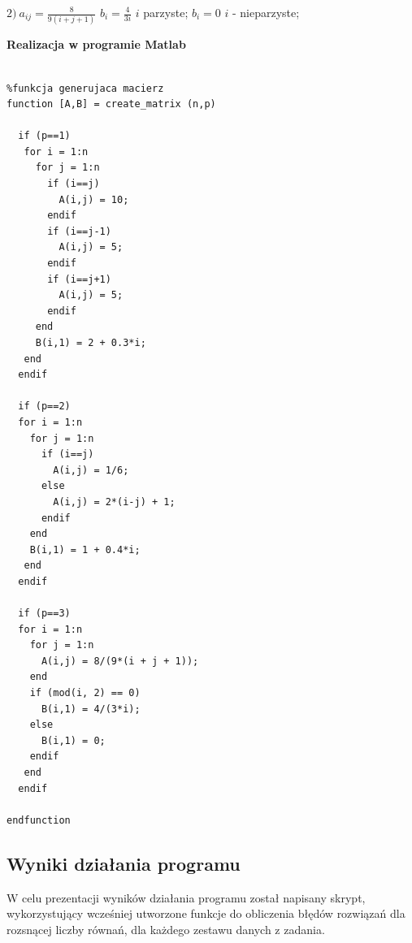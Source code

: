 \documentclass[a4paper, 11pt]{article}
\begin{document}
\hspace{2,4cm} $2) \ a_{ij} = \frac{8}{9(i+j+1)}$  \hspace{1cm} $b_{i} =\frac{4}{3i}$ $i$ parzyste; $b_{i} = 0$ $i$ - nieparzyste; \\

\vspace{1cm}

\textbf{Realizacja w programie Matlab}\\
\\
\begin{lstlisting}
%funkcja generujaca macierz 
function [A,B] = create_matrix (n,p)

  if (p==1)
   for i = 1:n
     for j = 1:n
       if (i==j)
         A(i,j) = 10;
       endif
       if (i==j-1)
         A(i,j) = 5;
       endif
       if (i==j+1)
         A(i,j) = 5;
       endif
     end
     B(i,1) = 2 + 0.3*i;
   end
  endif

  if (p==2) 
  for i = 1:n
    for j = 1:n
      if (i==j)
        A(i,j) = 1/6;
      else
        A(i,j) = 2*(i-j) + 1;
      endif
    end
    B(i,1) = 1 + 0.4*i;
   end
  endif

  if (p==3)
  for i = 1:n
    for j = 1:n
      A(i,j) = 8/(9*(i + j + 1));
    end
    if (mod(i, 2) == 0)
      B(i,1) = 4/(3*i);
    else
      B(i,1) = 0;
    endif
   end
  endif
  
endfunction
\end{lstlisting}

\subsection{Wyniki działania programu}
W celu prezentacji wyników działania programu został napisany skrypt, wykorzystujący wcześniej utworzone funkcje do obliczenia błędów rozwiązań dla rozsnącej liczby równań, dla każdego zestawu danych z zadania. \\
\vspace{1cm}
\end{document}
